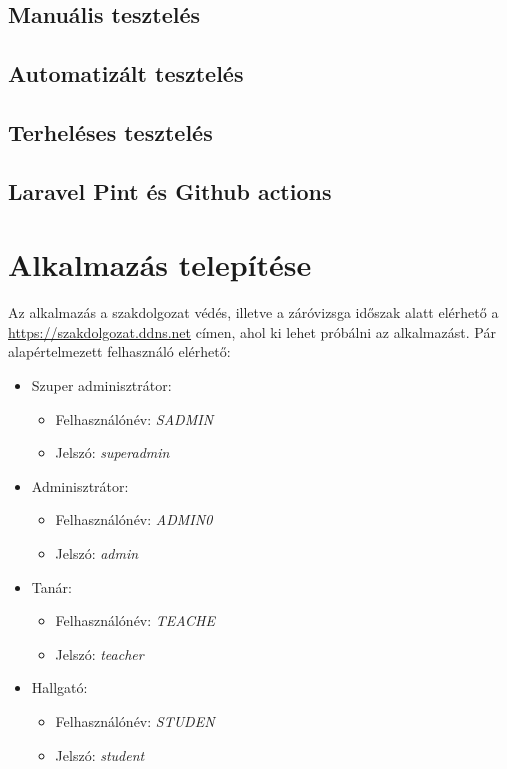 \documentclass[
]{thesis-ekf}
\theoremstyle{definition}
\theoremstyle{remark}
\begin{document}
\section{Manuális tesztelés}
\section{Automatizált tesztelés}
\section{Terheléses tesztelés}
\section{Laravel Pint és Github actions}

\chapter{Alkalmazás telepítése}
Az alkalmazás a szakdolgozat védés, illetve a záróvizsga időszak alatt elérhető a \url{https://szakdolgozat.ddns.net} címen, ahol ki lehet próbálni az alkalmazást. Pár alapértelmezett felhasználó elérhető:
\begin{itemize}
	\item Szuper adminisztrátor:
	\begin{itemize}
		\item Felhasználónév: \emph{SADMIN}
		\item Jelszó: \emph{superadmin}
	\end{itemize}
	\item Adminisztrátor:
	\begin{itemize}
		\item Felhasználónév: \emph{ADMIN0}
		\item Jelszó: \emph{admin}
	\end{itemize}
	\item Tanár:
	\begin{itemize}
		\item Felhasználónév: \emph{TEACHE}
		\item Jelszó: \emph{teacher}
	\end{itemize}
	\item Hallgató:
	\begin{itemize}
		\item Felhasználónév: \emph{STUDEN}
		\item Jelszó: \emph{student}
	\end{itemize}
\end{itemize}
\end{document}
